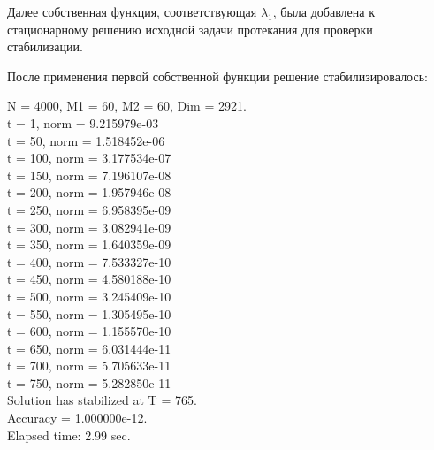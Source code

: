 \documentclass[12pt,a4paper]{article}
\begin{document}
Далее собственная функция, соответствующая $\lambda_1$, была добавлена к стационарному решению исходной задачи протекания для проверки стабилизации.

После применения первой собственной функции решение стабилизировалось:
\begin{center}
N = 4000, M1 =  60, M2 =  60, Dim =   2921. \\
t =   1, norm = 9.215979e-03 \\
t =  50, norm = 1.518452e-06 \\
t = 100, norm = 3.177534e-07 \\
t = 150, norm = 7.196107e-08 \\
t = 200, norm = 1.957946e-08 \\
t = 250, norm = 6.958395e-09 \\
t = 300, norm = 3.082941e-09 \\
t = 350, norm = 1.640359e-09 \\
t = 400, norm = 7.533327e-10 \\
t = 450, norm = 4.580188e-10 \\
t = 500, norm = 3.245409e-10 \\
t = 550, norm = 1.305495e-10 \\
t = 600, norm = 1.155570e-10 \\
t = 650, norm = 6.031444e-11 \\
t = 700, norm = 5.705633e-11 \\
t = 750, norm = 5.282850e-11 \\
Solution has stabilized at T = 765. \\
Accuracy = 1.000000e-12. \\
Elapsed time: 2.99 sec.
\end{center}
\end{document}
